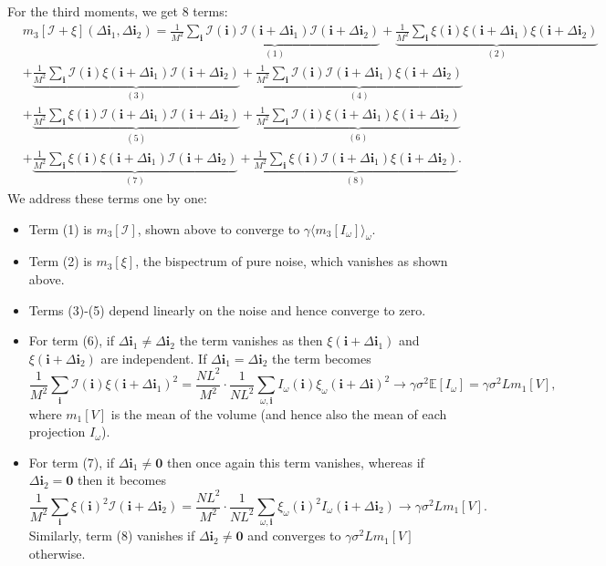 \documentclass{amsart}
\theoremstyle{definition}
\theoremstyle{remark}
\numberwithin{equation}{section}
\newcommand{\II}{\mathcal{I}}
\newcommand{\mb}{\mathbf}
\begin{document}
For the third moments, we get 8 terms:
\[\begin{aligned} 
&m_3[\II+\xi](\Delta\mb i_1, \Delta\mb i_2) =
\underbrace{\frac{1}{M^2}\sum_{\mb i}\II(\mb i)\II(\mb i+\Delta\mb
  i_1)\II(\mb i + \Delta\mb i_2)}_{(1)} +
\underbrace{\frac{1}{M^2}\sum_{\mb i}\xi(\mb i)\xi(\mb i+\Delta\mb i_1)\xi(\mb i + \Delta\mb i_2)}_{(2)}\\ 
&+ \underbrace{\frac{1}{M^2}\sum_{\mb i}\II(\mb i)\xi(\mb i + \Delta\mb i_1)\II(\mb i + \Delta\mb i_2)}_{(3)} +
\underbrace{\frac{1}{M^2}\sum_{\mb i}\II(\mb i)\II(\mb i + \Delta\mb i_1)\xi(\mb i + \Delta\mb i_2)}_{(4)}\\
&+ \underbrace{\frac{1}{M^2}\sum_{\mb i}\xi(\mb i)\II(\mb i + \Delta\mb i_1)\II(\mb i + \Delta\mb i_2)}_{(5)} +
\underbrace{\frac{1}{M^2}\sum_{\mb i}\II(\mb i)\xi(\mb i + \Delta\mb i_1)\xi(\mb i + \Delta\mb i_2)}_{(6)}\\
&+ \underbrace{\frac{1}{M^2}\sum_{\mb i}\xi(\mb i)\xi(\mb i + \Delta\mb i_1)\II(\mb i + \Delta\mb i_2)}_{(7)} +
\underbrace{\frac{1}{M^2}\sum_{\mb i}\xi(\mb i)\II(\mb i + \Delta\mb i_1)\xi(\mb i + \Delta\mb i_2)}_{(8)}.
\end{aligned}\]
We address these terms one by one:
\begin{itemize}
    \item Term (1) is $m_3[\II]$, shown above to converge to
    $\gamma\langle m_3[I_{\omega}]\rangle_{\omega}$.
    \item Term (2) is $m_3[\xi]$, the bispectrum of pure noise, which
      vanishes as shown above.
    \item Terms (3)-(5) depend linearly on the noise and hence
      converge to zero.
    \item For term (6), if $\Delta\mb i_1\neq \Delta\mb i_2$ the term
      vanishes as then $\xi(\mb i + \Delta\mb i_1)$ and $\xi(\mb i +
      \Delta\mb i_2)$ are independent. If $\Delta\mb i_1 = \Delta\mb
      i_2$ the term becomes
      \[ \frac{1}{M^2}\sum_{\mb i}\II(\mb i)\xi(\mb i + \Delta\mb i_1)^2
        = \frac{NL^2}{M^2}\cdot\frac{1}{NL^2}\sum_{\omega, \mb
          i}I_{\omega}(\mb i)\xi_{\omega}(\mb i + \Delta\mb i)^2 \to
        \gamma\sigma^2\mathbb{E}[I_{\omega}] =
        \gamma\sigma^2Lm_1[V],\]
      where $m_1[V]$ is the mean of the volume (and hence also the
      mean of each projection $I_{\omega}$).
    \item For term (7), if $\Delta\mb i_1 \neq \mb 0$ then once again
      this term vanishes, whereas if $\Delta\mb i_2 = \mb 0$ then it becomes
      \[ \frac{1}{M^2}\sum_{\mb i}\xi(\mb i)^2\II(\mb i + \Delta\mb
        i_2) = \frac{NL^2}{M^2}\cdot\frac{1}{NL^2}\sum_{\omega,\mb
          i}\xi_{\omega}(\mb i)^2I_{\omega}(\mb i + \Delta\mb i_2) \to
        \gamma\sigma^2Lm_1[V].\]
      Similarly, term (8) vanishes if $\Delta\mb i_2\neq \mb 0$ and
      converges to $\gamma\sigma^2Lm_1[V]$ otherwise.
\end{itemize}
\end{document}
